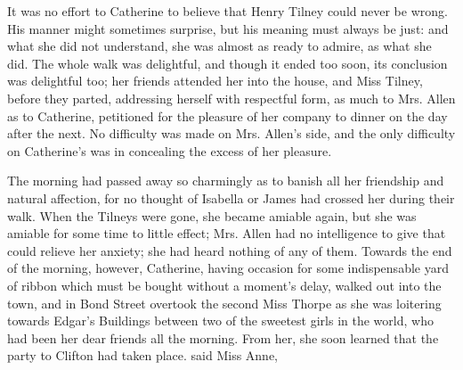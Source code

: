 







It was no effort to Catherine to believe that Henry Tilney could never be wrong. His manner might sometimes surprise, but his meaning must always be just: and what she did not understand, she was almost as ready to admire, as what she did. The whole walk was delightful, and though it ended too soon, its conclusion was delightful too; her friends attended her into the house, and Miss Tilney, before they parted, addressing herself with respectful form, as much to Mrs. Allen as to Catherine, petitioned for the pleasure of her company to dinner on the day after the next. No difficulty was made on Mrs. Allen's side, and the only difficulty on Catherine's was in concealing the excess of her pleasure.

The morning had passed away so charmingly as to banish all her friendship and natural affection, for no thought of Isabella or James had crossed her during their walk. When the Tilneys were gone, she became amiable again, but she was amiable for some time to little effect; Mrs. Allen had no intelligence to give that could relieve her anxiety; she had heard nothing of any of them. Towards the end of the morning, however, Catherine, having occasion for some indispensable yard of ribbon which must be bought without a moment's delay, walked out into the town, and in Bond Street overtook the second Miss Thorpe as she was loitering towards Edgar's Buildings between two of the sweetest girls in the world, who had been her dear friends all the morning. From her, she soon learned that the party to Clifton had taken place.  said Miss Anne, 


